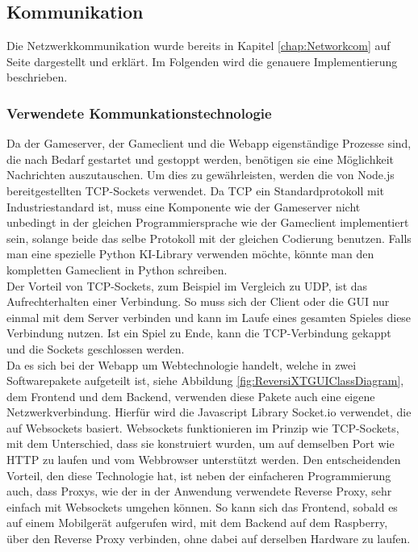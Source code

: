 \documentclass[12pt,a4paper,bibliography=totocnumbered,listof=totocnumbered]{article}
\begin{document}
\subsection{Kommunikation}
Die Netzwerkkommunikation wurde bereits in Kapitel \ref{chap:Networkcom} auf Seite \pageref{chap:Networkcom} dargestellt und erklärt.
Im Folgenden wird die genauere Implementierung beschrieben.

\subsubsection{Verwendete Kommunkationstechnologie}
Da der Gameserver, der Gameclient und die Webapp eigenständige Prozesse sind, die nach Bedarf gestartet und gestoppt werden, benötigen sie eine 
Möglichkeit Nachrichten auszutauschen. Um dies zu gewährleisten, werden die von Node.js bereitgestellten \ac{TCP}-Sockets verwendet. 
Da \ac{TCP} ein Standardprotokoll mit Industriestandard ist, muss eine Komponente wie der Gameserver nicht unbedingt in der gleichen Programmiersprache 
wie der Gameclient implementiert sein, solange beide das selbe Protokoll mit der gleichen Codierung benutzen.
Falls man eine spezielle Python \ac{KI}-Library verwenden möchte, könnte man den kompletten Gameclient in Python schreiben.
\\
Der Vorteil von \ac{TCP}-Sockets, zum Beispiel im Vergleich zu \ac{UDP}, ist das Aufrechterhalten einer Verbindung. So muss sich der Client oder die \ac{GUI} nur einmal mit dem Server verbinden 
und kann im Laufe eines gesamten Spieles diese Verbindung nutzen. Ist ein Spiel zu Ende, kann die \ac{TCP}-Verbindung gekappt und die 
Sockets geschlossen werden. 
\\
Da es sich bei der Webapp um Webtechnologie handelt, welche in zwei Softwarepakete aufgeteilt ist, siehe Abbildung \ref{fig:ReversiXTGUIClassDiagram}, dem Frontend und dem Backend, verwenden 
diese Pakete auch eine eigene Netzwerkverbindung. Hierfür wird die Javascript Library Socket.io verwendet, die auf Websockets basiert.
Websockets funktionieren im Prinzip wie \ac{TCP}-Sockets, mit dem Unterschied, dass sie konstruiert wurden, um auf demselben Port wie HTTP zu laufen und vom 
Webbrowser unterstützt werden. Den entscheidenden Vorteil, den diese Technologie hat, ist neben der einfacheren Programmierung auch, dass Proxys, 
wie der in der Anwendung verwendete Reverse Proxy, sehr einfach mit Websockets umgehen können. So kann sich das Frontend, sobald es auf einem 
Mobilgerät aufgerufen wird, mit dem Backend auf dem Raspberry, über den Reverse Proxy verbinden, ohne dabei auf derselben Hardware zu laufen.
\end{document}
